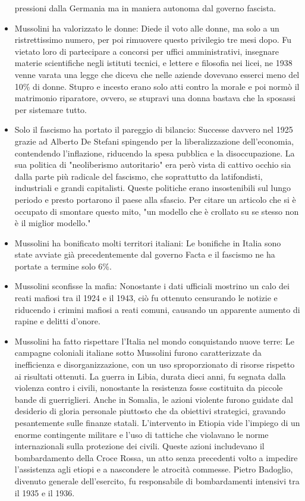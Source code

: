 \documentclass[12pt]{book} %
\begin{document}
\begin{mdframed}[linewidth=1pt]
\begin{itemize}
pressioni dalla Germania ma in maniera autonoma dal governo fascista.
\item Mussolini ha valorizzato le donne: Diede il voto alle donne, ma solo a un ristrettissimo numero, per poi rimuovere
questo privilegio tre mesi dopo. Fu vietato loro di partecipare a concorsi per uffici amministrativi, insegnare materie
scientifiche negli istituti tecnici, e lettere e filosofia nei licei, ne 1938 venne varata una legge che diceva che
nelle aziende dovevano esserci meno del 10\% di donne. Stupro e incesto erano solo atti contro la morale e poi normò il
matrimonio riparatore, ovvero, se stupravi una donna bastava che la sposassi per sistemare tutto.
\item Solo il fascismo ha portato il pareggio di bilancio: Successe davvero nel 1925 grazie ad Alberto De Stefani
spingendo per la liberalizzazione dell'economia, contendendo l'inflazione, riducendo la spesa pubblica e la
disoccupazione. La sua politica di "neoliberismo autoritario" era però vista di cattivo
occhio sia dalla parte più radicale del fascismo, che soprattutto da latifondisti, industriali e grandi capitalisti.
Queste politiche erano insostenibili sul lungo periodo e presto portarono il paese alla sfascio. Per citare un
articolo che si è occupato di smontare questo
mito, "un modello che è crollato su se stesso non è il miglior modello."
\item Mussolini ha bonificato molti territori italiani: Le bonifiche in Italia sono state avviate già precedentemente
dal governo Facta e il fascismo ne ha portate a termine solo 6\%.
\item Mussolini sconfisse la mafia: Nonostante i dati ufficiali mostrino un calo dei reati mafiosi tra il 1924 e il 1943, ciò fu ottenuto censurando le notizie e riducendo i crimini mafiosi a reati comuni, causando un apparente aumento di rapine e delitti d’onore.
\item Mussolini ha fatto rispettare l’Italia nel mondo conquistando nuove terre: Le campagne coloniali italiane sotto Mussolini furono caratterizzate da inefficienza e disorganizzazione, con un uso sproporzionato di risorse rispetto ai risultati ottenuti. La guerra in Libia, durata dieci anni, fu segnata dalla violenza contro i civili, nonostante la resistenza fosse costituita da piccole bande di guerriglieri. Anche in Somalia, le azioni violente furono guidate dal desiderio di gloria personale piuttosto che da obiettivi strategici, gravando pesantemente sulle finanze statali. L'intervento in Etiopia vide l'impiego di un enorme contingente militare e l'uso di tattiche che violavano le norme internazionali sulla protezione dei civili. Queste azioni includevano il bombardamento della Croce Rossa, un atto senza precedenti volto a impedire l'assistenza agli etiopi e a nascondere le atrocità commesse. Pietro Badoglio, divenuto generale dell'esercito, fu responsabile di bombardamenti intensivi tra il 1935 e il 1936.

\end{itemize}
\end{mdframed}
\end{document}
